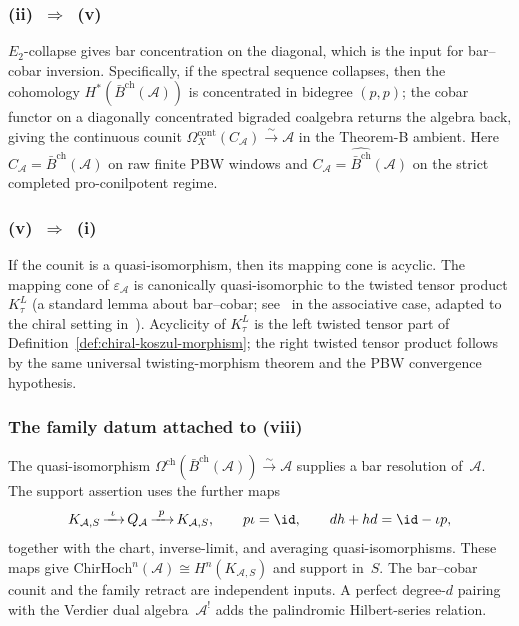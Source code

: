 \documentclass[11pt,reqno]{amsart}
\theoremstyle{definition}
\theoremstyle{remark}
\newcommand{\cA}{\mathcal{A}}
\newcommand{\barBgeom}{\bar{B}^{\mathrm{ch}}}
\newcommand{\ChirHoch}{\mathrm{ChirHoch}}
\numberwithin{equation}{section}
\begin{document}
\subsubsection*{\textup{(ii)}~$\Rightarrow$~\textup{(v)}}

$E_2$-collapse gives bar concentration on the diagonal, which is
the input for bar--cobar inversion. Specifically, if the spectral
sequence collapses, then the cohomology $H^*(\barBgeom(\cA))$ is
concentrated in bidegree $(p,p)$; the cobar functor on a
diagonally concentrated bigraded coalgebra returns the algebra
back, giving
the continuous counit
$\Omega_X^{\mathrm{cont}}(C_\cA)\xrightarrow{\sim}\cA$ in the
Theorem-B ambient. Here $C_\cA=\barBgeom(\cA)$ on raw finite PBW
windows and $C_\cA=\widehat{\barBgeom}(\cA)$ on the strict
completed pro-conilpotent regime.

\subsubsection*{\textup{(v)}~$\Rightarrow$~\textup{(i)}}

If the counit is a quasi-isomorphism, then its mapping cone is
acyclic. The mapping cone of $\varepsilon_\cA$ is canonically
quasi-isomorphic to the twisted tensor product $K_\tau^L$
(a standard lemma about bar--cobar; see~\cite[\S2.2]{LV12} in the
associative case, adapted to the chiral setting
in~\cite{LorgatMKD1}). Acyclicity of $K_\tau^L$ is the left
twisted tensor part of Definition~\ref{def:chiral-koszul-morphism};
the right twisted tensor product follows by the same universal
twisting-morphism theorem and the PBW convergence hypothesis.

\subsubsection*{The family datum attached to \textup{(viii)}}

The quasi-isomorphism $\Omega^{\mathrm{ch}}(\barBgeom(\cA))
\xrightarrow{\sim}\cA$ supplies a bar resolution of~$\cA$.
The support assertion uses the further maps
\[
 K_{\cA,S}\mathop{\xrightarrow{\ \iota\ }}Q_\cA
 \mathop{\xrightarrow{\ p\ }}K_{\cA,S},
 \qquad p\iota=\id,
 \qquad dh+hd=\id-\iota p,
\]
together with the chart, inverse-limit, and averaging
quasi-isomorphisms.  These maps give
$\ChirHoch^n(\cA)\cong H^n(K_{\cA,S})$ and support in~$S$.
The bar--cobar counit and the family retract are independent inputs.
A perfect degree-$d$ pairing with the Verdier dual algebra~$\cA^!$
adds the palindromic Hilbert-series relation.
\end{document}
